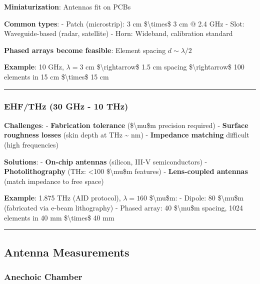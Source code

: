 \textbf{Miniaturization}: Antennas fit on PCBs

\textbf{Common types}: - Patch (microstrip): 3 cm
\$\textbackslash times\$ 3 cm @ 2.4 GHz - Slot: Waveguide-based (radar,
satellite) - Horn: Wideband, calibration standard

\textbf{Phased arrays become feasible}: Element spacing
\(d \sim \lambda/2\)

\textbf{Example}: 10 GHz, \(\lambda = 3\) cm
\$\textbackslash rightarrow\$ 1.5 cm spacing
\$\textbackslash rightarrow\$ 100 elements in 15 cm
\$\textbackslash times\$ 15 cm

\begin{center}\rule{0.5\linewidth}{0.5pt}\end{center}

\subsubsection{EHF/THz (30 GHz - 10 THz)}\label{ehfthz-30-ghz---10-thz}

\textbf{Challenges}: - \textbf{Fabrication tolerance}
(\$\textbackslash mu\$m precision required) - \textbf{Surface roughness
losses} (skin depth at THz \textasciitilde{} nm) - \textbf{Impedance
matching} difficult (high frequencies)

\textbf{Solutions}: - \textbf{On-chip antennas} (silicon, III-V
semiconductors) - \textbf{Photolithography} (THz: \textless100
\$\textbackslash mu\$m features) - \textbf{Lens-coupled antennas} (match
impedance to free space)

\textbf{Example}: 1.875 THz (AID protocol), \(\lambda = 160\)
\$\textbackslash mu\$m: - Dipole: 80 \$\textbackslash mu\$m (fabricated
via e-beam lithography) - Phased array: 40 \$\textbackslash mu\$m
spacing, 1024 elements in 40 mm \$\textbackslash times\$ 40 mm

\begin{center}\rule{0.5\linewidth}{0.5pt}\end{center}

\subsection{Antenna Measurements}\label{antenna-measurements}

\subsubsection{Anechoic Chamber}\label{anechoic-chamber}

